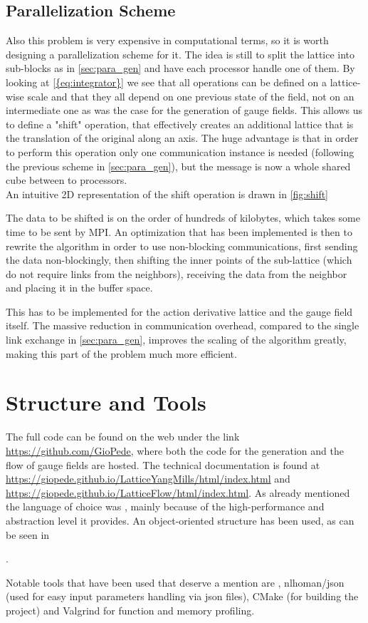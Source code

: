 \subsection{Parallelization Scheme}
Also this problem is very expensive in computational terms, so it is worth designing a parallelization scheme for it. The idea is still to split the lattice into sub-blocks as in \cref{sec:para_gen} and have each processor handle one of them.
By looking at \cref{{eq:integrator}} we see that all operations can be defined on a lattice-wise scale and that they all depend on one previous state of the field, not on an intermediate one as was the case for the generation of gauge fields. This allows us to define a "shift" operation, that effectively creates an additional lattice that is the translation of the original along an axis. The huge advantage is that in order to perform this operation only one communication instance is needed (following the previous scheme in \cref{sec:para_gen}), but the message is now a whole shared cube between to processors. \\
An intuitive 2D representation of the shift operation is drawn in \cref{fig:shift}


The data to be shifted is on the order of hundreds of kilobytes, which takes some time to be sent by MPI. An optimization that has been implemented is then to rewrite the algorithm in order to use non-blocking communications, first sending the data non-blockingly, then shifting the inner points of the sub-lattice (which do not require links from the neighbors), receiving the data from the neighbor and placing it in the buffer space.

This has to be implemented for the action derivative lattice and the gauge field itself. The massive reduction in communication overhead, compared to the single link exchange in \cref{sec:para_gen}, improves the scaling of the algorithm greatly, making this part of the problem much more efficient.


\section{Structure and Tools}
The full code can be found on the web under the link \url{https://github.com/GioPede}, where both the code for the generation and the flow of gauge fields are hosted. The technical documentation is found at \url{https://giopede.github.io/LatticeYangMills/html/index.html} and \url{https://giopede.github.io/LatticeFlow/html/index.html}. As already mentioned the language of choice was \cpp, mainly because of the high-performance and abstraction level it  provides. An object-oriented structure has been used, as can be seen in 

. 

Notable tools that have been used that deserve a mention are \mpi, nlhoman/json \cite{noauthor_json/index.md_nodate} (used for easy input parameters handling via json files), CMake (for building the project) and Valgrind for function and memory profiling. 
